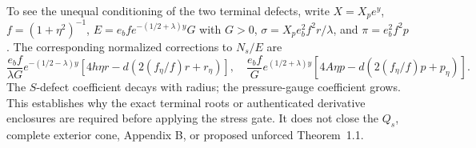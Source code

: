 To see the unequal conditioning of the two terminal defects,
write $X=X_pe^y$, $f=(1+\eta^2)^{-1}$,
$E=e_b f e^{-(1/2+\lambda)y}G$ with $G>0$,
$\sigma=X_pe_b^2f^2r/\lambda$, and $\pi=e_b^2f^2p$.
The corresponding normalized corrections to $N_s/E$ are
\[
 \frac{e_bf}{\lambda G}e^{-(1/2-\lambda)y}
 \left[4h\eta r-d\left(2(f_\eta/f)r+r_\eta\right)\right],
\quad
 \frac{e_bf}{G}e^{(1/2+\lambda)y}
 \left[4A\eta p-d\left(2(f_\eta/f)p+p_\eta\right)\right].
\]
The $S$-defect coefficient decays with radius;
the pressure-gauge coefficient grows. This establishes
why the exact terminal roots or authenticated derivative
enclosures are required before applying the stress gate.
It does not close the $Q_s$, complete exterior cone,
Appendix B, or proposed unforced Theorem~1.1.